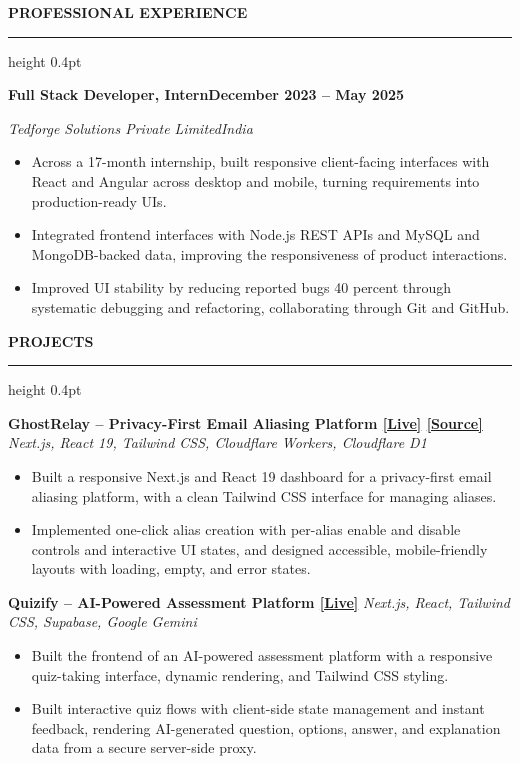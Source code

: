 \documentclass[10pt,a4paper]{article}
\newcommand{\resumeSection}[1]{%
  \vspace{5pt}
  {\normalsize\bfseries\color{heading} #1}\par
  \vspace{1pt}
  {\color{rulecolor}\hrule height 0.4pt}
  \vspace{3pt}
}
\newcommand{\resumeSubheading}[4]{%
  \textbf{#1}\hfill\textbf{#2}\par
  \textit{#3}\hfill\textit{#4}\par
  \vspace{-0.15em}
}
\newcommand{\projectHeading}[2]{%
  \textbf{#1} \textbar{} \textit{#2}\par
  \vspace{-0.15em}
}
\begin{document}
\normalsize

\resumeSection{PROFESSIONAL EXPERIENCE}

\resumeSubheading
{Full Stack Developer, Intern}
{December 2023 -- May 2025}
{Tedforge Solutions Private Limited}
{India}

\begin{itemize}
  \item Across a 17-month internship, built responsive client-facing
  interfaces with React and Angular across desktop and mobile, turning
  requirements into production-ready UIs.

  \item Integrated frontend interfaces with Node.js REST APIs and MySQL and
  MongoDB-backed data, improving the responsiveness of product interactions.

  \item Improved UI stability by reducing reported bugs 40 percent through
  systematic debugging and refactoring, collaborating through Git and GitHub.
\end{itemize}

\resumeSection{PROJECTS}

\projectHeading
{GhostRelay -- Privacy-First Email Aliasing Platform \href{https://ghostrelay.me}{[Live]} \href{https://github.com/Tech-aficionado/GhostRelay---Open-Source}{[Source]}}
{Next.js, React 19, Tailwind CSS, Cloudflare Workers, Cloudflare D1}

\begin{itemize}
  \item Built a responsive Next.js and React 19 dashboard for a privacy-first
  email aliasing platform, with a clean Tailwind CSS interface for managing
  aliases.

  \item Implemented one-click alias creation with per-alias enable and
  disable controls and interactive UI states, and designed accessible,
  mobile-friendly layouts with loading, empty, and error states.
\end{itemize}

\projectHeading
{Quizify -- AI-Powered Assessment Platform \href{https://quizify.ash-labs.tech}{[Live]}}
{Next.js, React, Tailwind CSS, Supabase, Google Gemini}

\begin{itemize}
  \item Built the frontend of an AI-powered assessment platform with a
  responsive quiz-taking interface, dynamic rendering, and Tailwind CSS
  styling.

  \item Built interactive quiz flows with client-side state management and
  instant feedback, rendering AI-generated question, options, answer, and
  explanation data from a secure server-side proxy.
\end{itemize}
\end{document}
